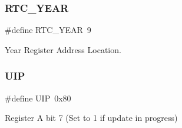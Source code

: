 \subsubsection{\texorpdfstring{R\+T\+C\+\_\+\+Y\+E\+AR}{RTC\_YEAR}}
{\footnotesize\ttfamily \#define R\+T\+C\+\_\+\+Y\+E\+AR~9}



Year Register Address Location. 

\mbox{\label{group__RTC_ga3289eebd69837790d4aacaccd18d46db}} 
\subsubsection{\texorpdfstring{U\+IP}{UIP}}
{\footnotesize\ttfamily \#define U\+IP~0x80}



Register A bit 7 (Set to 1 if update in progress) 

